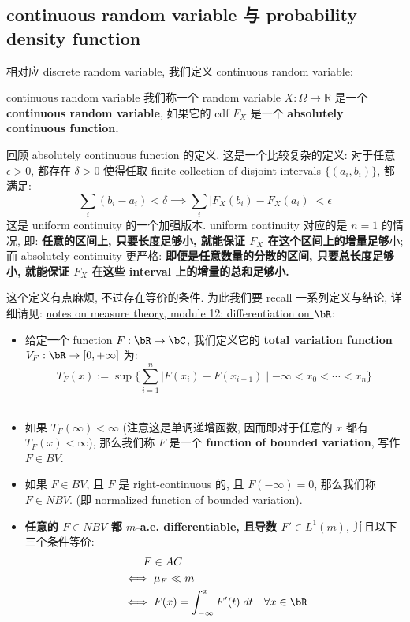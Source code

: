 \subsection{continuous random variable 与 probability density function}
相对应 discrete random variable, 我们定义 continuous random variable:
\begin{definition}{continuous random variable}\label{continuous-rv}
    我们称一个 random variable \(X: \Omega \to \mathbb{R}\) 
    是一个 \textbf{continuous random variable}, 如果它的 cdf \(F_X\) 是一个 
     \textbf{absolutely continuous function.}
\end{definition}
\begin{remark}
    回顾 absolutely continuous function 的定义, 这是一个比较复杂的定义:
    对于任意 \(\epsilon > 0\), 都存在 \(\delta > 0\) 
    使得任取 finite collection of 
    disjoint intervals \(\{(a_i,b_i)\}\), 都满足: 
    \[\sum_i (b_i - a_i) < \delta \implies \sum_i |F_X(b_i) - F_X(a_i)| < \epsilon\]
    这是 uniform continuity 的一个加强版本. uniform continuity 对应的是 \(n=1\)
    的情况, 即: \textbf{任意的区间上, 只要长度足够小, 就能保证 \(F_X\) 在这个区间上的增量足够}小; 
     而 absolutely continuity 更严格: 
    \textbf{即便是任意数量的分散的区间, 只要总长度足够小, 就能保证 \(F_X\) 在这些 interval 上的增量的总和足够小.}

    这个定义有点麻烦, 不过存在等价的条件. 为此我们要 recall 一系列定义与结论, 详细请见: \href{https://qiulinfan.github.io/mathnotes-measure_theory/12-differentiation_on_real_spaces.html}{notes on measure theory, module 12: differentiation on \(\bR\)}:
    \begin{itemize}
        \item 给定一个 function \(F: \bR \to \bC\), 我们定义它的 
        \textbf{total variation function} \(V_F: \bR \to [0,+\infty]\) 为: \[
        T_F(x) := \sup \big\{ \sum_{i=1}^n |F(x_i) - F(x_{i-1}) \mid  -\infty < x_0 < \cdots < x_n \big\}
         \] \
        \item 如果 \(T_F(\infty)<\infty  \) (注意这是单调递增函数, 因而即对于任意的 \(x\) 都有 \(T_F(x) < \infty\)), 那么我们称 \(F\) 是一个 \textbf{function of bounded variation}, 写作 \(F \in BV\).
        \item 如果 \(F \in BV\), 且 \(F\) 是 right-continuous 的, 且 \(F(-\infty) = 0\), 那么我们称 \(F \in NBV\). (即 normalized function of bounded variation).
        \item \textbf{任意的 \(F \in NBV\) 都 \(m\)-a.e. differentiable, 且导数 \(F' \in L^1(m)\)}, 并且以下三个条件等价:
        \begin{align}
            &\quad\quad F \in AC  \\
            &\iff   \mu_F \ll m \\
            &\iff  F(x) = \int_{-\infty}^x F'(t) \;dt \quad\forall x \in \bR 
        \end{align}
    \end{itemize}
 \end{remark}

